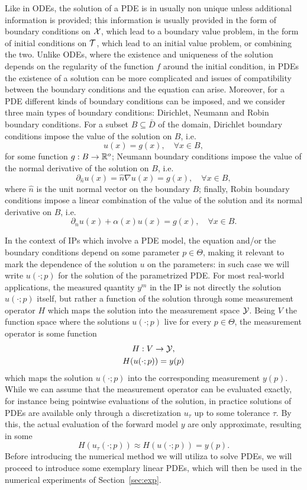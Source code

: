 Like in ODEs, the solution of a PDE is in usually non unique unless additional information is provided; this information is usually provided in the form of boundary conditions on $\mathcal X$, which lead to a boundary value problem, in the form of initial conditions on $\mathcal T$, which lead to an initial value problem, or combining the two.
Unlike ODEs, where the existence and uniqueness of the solution depends on the regularity of the function $f$ around the initial condition, in PDEs the existence of a solution can be more complicated and issues of compatibility between the boundary conditions and the equation can arise.
Moreover, for a PDE different kinds of boundary conditions can be imposed, and we consider three main types of boundary conditions: Dirichlet, Neumann and Robin boundary conditions.
For a subset $B \subseteq \bar D$ of the domain, Dirichlet boundary conditions impose the value of the solution on $B$, i.e.
\[
    u(x) = g(x), \quad \forall x \in B,
\]
for some function $g: B \rightarrow \mathbb{R}^o$;
Neumann boundary conditions impose the value of the normal derivative of the solution on $B$, i.e.
\[
    \partial_{\hat{n}} u(x)= \hat n \nabla u(x) = g(x), \quad \forall x \in B,
\]
where $\hat n$ is the unit normal vector on the boundary $B$; 
finally, Robin boundary conditions impose a linear combination of the value of the solution and its normal derivative on $B$, i.e.
\[
    \partial_{\hat{n}} u(x) + \alpha(x) u(x) = g(x), \quad \forall x \in B.
\]

In the context of IPs which involve a PDE model, the equation and/or the boundary conditions depend on some parameter $p \in \Theta$, making it relevant to mark the dependence of the solution $u$ on the parameters: in such case we will write $u(\cdot;p)$ for the solution of the parametrized PDE.
For most real-world applications, the measured quantity $y^m$ in the IP is not directly the solution $u(\cdot;p)$ itself, but rather a function of the solution through some measurement operator $H$ which maps the solution into the measurement space $\mathcal Y$.
Being $V$ the function space where the solutions $u(\cdot;p)$ live for every $p \in \Theta$, the measurement operator is some function 
\begin{equation} \label{eq:measurement-operator}
    \begin{gathered}
        H : V \rightarrow \mathcal Y, \\
        H(u(\cdot;p)) = y(p)
    \end{gathered}
\end{equation}
which maps the solution $u(\cdot;p)$ into the corresponding measurement $y(p)$.
While we can assume that the measurement operator can be evaluated exactly, for instance being pointwise evaluations of the solution, in practice solutions of PDEs are available only through a discretization $u_\tau$ up to some tolerance $\tau$.
By this, the actual evaluation of the forward model $y$ are only approximate, resulting in some
\[
    H(u_\tau(\cdot;p)) \approx H(u(\cdot;p)) = y(p) .
\]
Before introducing the numerical method we will utiliza to solve PDEs, we will proceed to introduce some exemplary linear PDEs, which will then be used in the numerical experiments of Section~\ref{sec:exp}.\medskip

